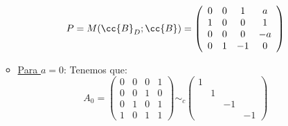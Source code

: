 \begin{ejercicio}
\begin{enumerate}
\begin{itemize}
            \begin{equation*}
                P=M(\cc{B}_D; \cc{B})=\left(\begin{array}{cccc}
                    0 & 0 & 1 & a \\
                    1 & 0 & 0 & 1 \\
                    0 & 0 & 0 & -a \\
                    0 & 1 & -1 & 0
                \end{array} \right)
            \end{equation*}
            
            \item \underline{Para $a=0$}:
            Tenemos que:
            \begin{equation*}
                A_0 = \left(\begin{array}{cccc}
                    0 & 0 & 0 & 1 \\
                    0 & 0 & 1 & 0 \\
                    0 & 1 & 0 & 1 \\
                    1 & 0 & 1 & 1
                \end{array} \right) \sim_c \left( \begin{array}{cccc}
                    1 &&& \\
                    &1&& \\
                    &&-1&\\
                    &&&-1
                \end{array} \right)
            \end{equation*}


\end{itemize}
\end{enumerate}
\end{ejercicio}
